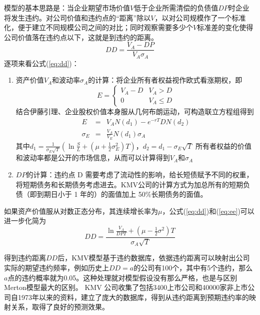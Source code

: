\documentclass[a4paper,12pt]{ctexart}
\begin{document}
模型的基本思路是：当企业期望市场价值$V$低于企业所需清偿的负债值$DP$时企业将发生违约。对公司价值和违约点的“距离”除以$V$，以对公司规模作了一个标准化，便于建立不同规模公司之间的对比；同时观察需要多少个$V$标准差的变化使得公司价值落在违约点以下，这就是到违约的距离。
\begin{equation}
    DD=\frac{V_A-DP}{V_A\sigma_A}\label{eq:dd}
\end{equation}
逐项来看公式(\ref{eq:dd})：
\begin{enumerate}
    \item 资产价值$V_A$和波动率$\sigma_A$的计算：将企业所有者权益视作欧式看涨期权，即\begin{equation*}
              E=\begin{cases}
                  V_A-D & V_A>D    \\
                  0     & V_A\le D
              \end{cases}
          \end{equation*}
          结合伊藤引理、企业股权价值本身服从几何布朗运动，可构造联立方程组得到\begin{eqnarray}
              E&=&V_AN(d_1)-e^{-rT}DN(d_2)\label{eq:ee}\\
              \sigma_E&=&\frac{V_A}{V_E} N(d_1)\sigma_A
          \end{eqnarray}其中$d_1=\frac{1}{\sigma_E\sqrt{T}}(\ln \frac{S}{L}+(\mu+\frac{1}{2}\sigma^2_E)T)$，$d_2=d_1-\sigma_E\sqrt{T}$
          所有者权益的价值和波动率都是公开的市场信息，从而可以计算得到$V_A$和$\sigma_A$
    \item $DP$的计算：违约点 D 需要考虑了流动性的影响，给长短债赋予不同的权重，将短期债务和长期债务考虑进去。KMV公司的计算方式为加总所有的短期负债（即到期日小于 1 年的）的面值加上 50\%长期债务的面值。
\end{enumerate}

如果资产价值服从对数正态分布，其连续增长率为$\mu$，公式(\ref{eq:dd})和(\ref{eq:ee})可以进一步化简为
\begin{equation}
    DD=\frac{\ln \frac{V_A}{DPT}+(\mu-\frac{1}{2}\sigma^2)T}{\sigma_A\sqrt{T}}\label{eq:f}
\end{equation}

得到违约距离$DD$后，KMV模型基于违约数据库，依据违约距离可以映射出公司实际的期望违约频率，例如历史上$DD=a$的公司有100个，其中有5个违约，那么$a$点的违约概率就为0.05。这种处理就对模型假设没有那么严格，也是与区别Merton模型最大的区别。 KMV 公司收集了包括3400上市公司和40000家非上市公司自1973年以来的资料，建立了庞大的数据库，得到从违约距离到预期违约率的映射关系，取得了良好的预测效果。
\end{document}
